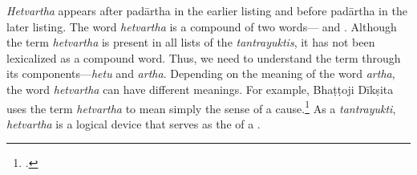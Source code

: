 \emph{Hetvartha} appears after padārtha in the earlier listing 
and before padārtha in the later listing. 
The word \emph{hetvartha} is a compound 
of two words--- and . 
Although the term \emph{hetvartha} is present in all lists of the \emph{tantrayuktis}, 
it has not been lexicalized as a compound word. 
Thus, we need to understand the term 
through its components---\emph{hetu} and \emph{artha}. 
Depending on the meaning of the word \emph{artha}, 
the word \emph{hetvartha} can have different meanings. 
For example, Bhaṭṭoji Dīkṣita uses the term \emph{hetvartha} 
to mean simply the sense of a cause.\footnote{%
	 \cite[137]{gada-1904}.} 
As a \emph{tantrayukti}, \emph{hetvartha} is a logical device 
that serves as the  of a . 

